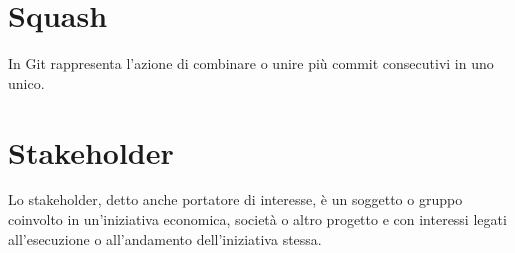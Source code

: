 \section{Squash}
In Git rappresenta l'azione di combinare o unire più commit consecutivi in uno unico.

\section{Stakeholder}
Lo stakeholder, detto anche portatore di interesse, è un soggetto o gruppo coinvolto in un'iniziativa economica, società o altro progetto e con interessi legati all’esecuzione o all’andamento dell'iniziativa stessa.
